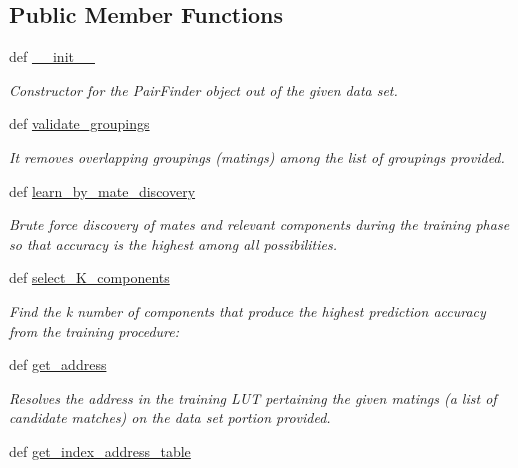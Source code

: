 \subsection*{Public Member Functions}
\begin{DoxyCompactItemize}
\item 
def \hyperlink{classmate__learning_1_1_mate_finder_adb527f8a50802bee9dc7b976e38809bb}{\+\_\+\+\_\+init\+\_\+\+\_\+}
\begin{DoxyCompactList}\small\item\em Constructor for the Pair\+Finder object out of the given data set. \end{DoxyCompactList}\item 
def \hyperlink{classmate__learning_1_1_mate_finder_ad550cd77ba9a781f7eb09316de71f3f2}{validate\+\_\+groupings}
\begin{DoxyCompactList}\small\item\em It removes overlapping groupings (matings) among the list of groupings provided. \end{DoxyCompactList}\item 
def \hyperlink{classmate__learning_1_1_mate_finder_a45cb9b80fefff297b6c44a0d3bb81b83}{learn\+\_\+by\+\_\+mate\+\_\+discovery}
\begin{DoxyCompactList}\small\item\em Brute force discovery of mates and relevant components during the training phase so that accuracy is the highest among all possibilities. \end{DoxyCompactList}\item 
def \hyperlink{classmate__learning_1_1_mate_finder_ae5e19b18a5e29e8ada0303753f23aff0}{select\+\_\+\+K\+\_\+components}
\begin{DoxyCompactList}\small\item\em Find the k number of components that produce the highest prediction accuracy from the training procedure\+: \end{DoxyCompactList}\item 
def \hyperlink{classmate__learning_1_1_mate_finder_a2de3f01d6c2b6b73e8673abdd405b868}{get\+\_\+address}
\begin{DoxyCompactList}\small\item\em Resolves the address in the training L\+U\+T pertaining the given matings (a list of candidate matches) on the data set portion provided. \end{DoxyCompactList}\item 
def \hyperlink{classmate__learning_1_1_mate_finder_a096518e1bff5159c934c2e8affb5f40d}{get\+\_\+index\+\_\+address\+\_\+table}

\end{DoxyCompactItemize}
